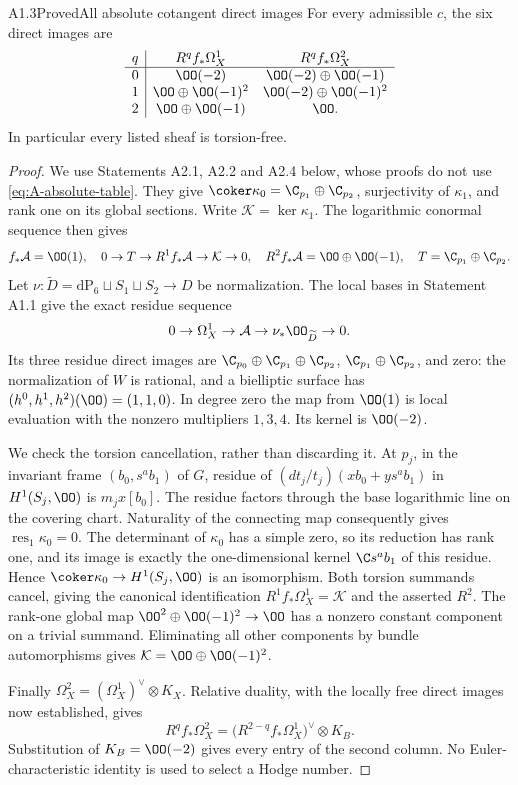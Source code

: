 \begin{claim}{A1.3}{Proved}{All absolute cotangent direct images}
For every admissible $c$, the six direct images are
\begin{equation}\label{eq:A-absolute-table}
\begin{array}{c|cc}
q&R^qf_*\Omega_X^1&R^qf_*\Omega_X^2\\\hline
0&\OO(-2)&\OO(-2)\oplus\OO(-1)\\
1&\OO\oplus\OO(-1)^2&\OO(-2)\oplus\OO(-1)^2\\
2&\OO\oplus\OO(-1)&\OO.
\end{array}
\end{equation}
In particular every listed sheaf is torsion-free.
\end{claim}
\begin{proof}
We use Statements A2.1, A2.2 and A2.4 below, whose proofs do not use
\eqref{eq:A-absolute-table}.  They give
$\coker\kappa_0=\C_{p_1}\oplus\C_{p_2}$,
surjectivity of $\kappa_1$, and rank one on its global sections.
Write $\mathcal K=\ker\kappa_1$.  The logarithmic conormal sequence
then gives
\[
f_*\mathcal A=\OO(1),\quad
0\to T\to R^1f_*\mathcal A\to\mathcal K\to0,\quad
R^2f_*\mathcal A=\OO\oplus\OO(-1),
\quad T=\C_{p_1}\oplus\C_{p_2}.
\]
Let $\nu:\widetilde D=\mathrm{dP}_6\sqcup S_1\sqcup S_2\to D$
be normalization.  The local bases in Statement A1.1 give the exact
residue sequence
\[
0\to\Omega_X^1\to\mathcal A\to\nu_*\OO_{\widetilde D}\to0.
\]
Its three residue direct images are
$\C_{p_0}\oplus\C_{p_1}\oplus\C_{p_2}$,
$\C_{p_1}\oplus\C_{p_2}$, and zero: the normalization of $W$ is
rational, and a bielliptic surface has $(h^0,h^1,h^2)(\OO)=(1,1,0)$.
In degree zero the map from $\OO(1)$ is local evaluation with the
nonzero multipliers $1,3,4$.  Its kernel is $\OO(-2)$.

We check the torsion cancellation, rather than discarding it.  At
$p_j$, in the invariant frame $(b_0,s^ab_1)$ of $G$, residue of
$(dt_j/t_j)(x b_0+y s^ab_1)$ in $H^1(S_j,\OO)$ is $m_jx[b_0]$.
The residue factors through the base logarithmic line on the covering
chart.  Naturality of the connecting map consequently gives
$\operatorname{res}_1\kappa_0=0$.  The determinant of $\kappa_0$
has a simple zero, so its reduction has rank one, and its image is
exactly the one-dimensional kernel $\C s^ab_1$ of this residue.
Hence $\coker\kappa_0\to H^1(S_j,\OO)$ is an isomorphism.
Both torsion summands cancel, giving the canonical identification
$R^1f_*\Omega_X^1=\mathcal K$ and the asserted $R^2$.
The rank-one global map
$\OO^2\oplus\OO(-1)^2\to\OO$ has a nonzero constant component
on a trivial summand.  Eliminating all other components by bundle
automorphisms gives
$\mathcal K=\OO\oplus\OO(-1)^2$.

Finally $\Omega_X^2=(\Omega_X^1)^\vee\otimes K_X$.  Relative
duality, with the locally free direct images now established, gives
\[
R^qf_*\Omega_X^2
=\bigl(R^{2-q}f_*\Omega_X^1\bigr)^\vee\otimes K_B.
\]
Substitution of $K_B=\OO(-2)$ gives every entry of the second column.
No Euler-characteristic identity is used to select a Hodge number.
\end{proof}
